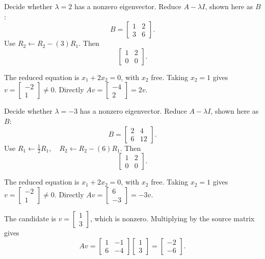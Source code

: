 \goal Decide whether $\lambda=2$ has a nonzero eigenvector. Reduce $A-\lambda I$, shown here as $B$:
\[ B=\begin{bmatrix}1 & 2\\3 & 6\end{bmatrix}.\]
Use $R_{2}\leftarrow R_{2}-(3)R_{1}$. Then
\[ \begin{bmatrix}1 & 2\\0 & 0\end{bmatrix}.\]

The reduced equation is $x_1+2x_2=0$, with $x_2$ free. Taking $x_2=1$ gives $v=\begin{bmatrix}-2\\1\end{bmatrix}\ne0$. Directly $Av=\begin{bmatrix}-4\\2\end{bmatrix}=2v$.

\goal Decide whether $\lambda=-3$ has a nonzero eigenvector. Reduce $A-\lambda I$, shown here as $B$:
\[ B=\begin{bmatrix}2 & 4\\6 & 12\end{bmatrix}.\]
Use $R_{1}\leftarrow \frac{1}{2}R_{1},\quad R_{2}\leftarrow R_{2}-(6)R_{1}$. Then
\[ \begin{bmatrix}1 & 2\\0 & 0\end{bmatrix}.\]

The reduced equation is $x_1+2x_2=0$, with $x_2$ free. Taking $x_2=1$ gives $v=\begin{bmatrix}-2\\1\end{bmatrix}\ne0$. Directly $Av=\begin{bmatrix}6\\-3\end{bmatrix}=-3v$.

The candidate is $v=\begin{bmatrix}1\\3\end{bmatrix}$, which is nonzero. Multiplying by the source matrix gives
\[ Av=\begin{bmatrix}1 & -1\\6 & -4\end{bmatrix}\begin{bmatrix}1\\3\end{bmatrix}=\begin{bmatrix}-2\\-6\end{bmatrix}.\]

